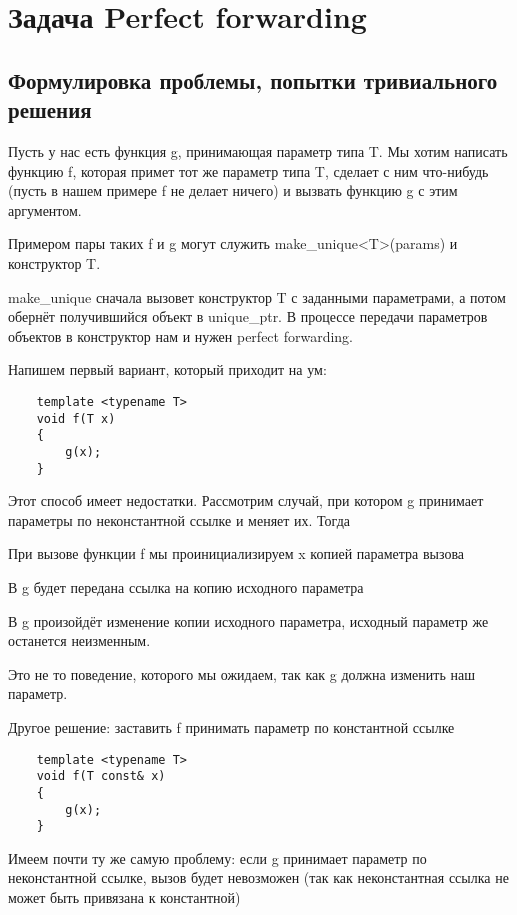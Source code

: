 \section{Задача Perfect forwarding}

\subsection{Формулировка проблемы, попытки тривиального решения}

	Пусть у нас есть функция g, принимающая параметр типа T. Мы хотим написать функцию f, которая примет тот же параметр типа T, сделает с ним что-нибудь (пусть в нашем примере f не делает ничего) и вызвать функцию g с этим аргументом.

	Примером пары таких f и g могут служить make\_unique<T>(params) и конструктор T.

	make\_unique сначала вызовет конструктор T с заданными параметрами, а потом обернёт получившийся объект в unique\_ptr. В процессе передачи параметров объектов в конструктор нам и нужен perfect forwarding.

	Напишем первый вариант, который приходит на ум:

	\begin{verbatim}
	template <typename T>
	void f(T x)
	{
	    g(x);
	}
	\end{verbatim}

	Этот способ имеет недостатки. Рассмотрим случай, при котором g принимает параметры по неконстантной ссылке и меняет их. Тогда

	При вызове функции f мы проинициализируем x копией параметра вызова

	В g будет передана ссылка на копию исходного параметра

	В g произойдёт изменение копии исходного параметра, исходный параметр же останется неизменным.

	Это не то поведение, которого мы ожидаем, так как g должна изменить наш параметр.

	Другое решение: заставить f принимать параметр по константной ссылке

	\begin{verbatim}
	template <typename T>
	void f(T const& x)
	{
	    g(x);
	}
	\end{verbatim}

	Имеем почти ту же самую проблему: если g принимает параметр по неконстантной ссылке, вызов будет невозможен (так как неконстантная ссылка не может быть привязана к константной)

